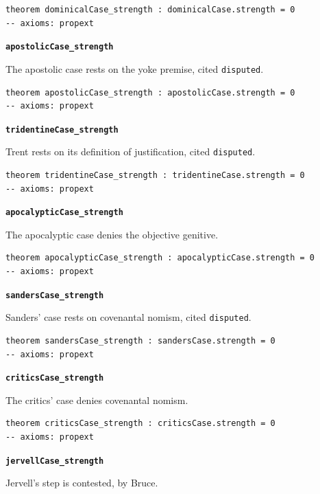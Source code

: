 \documentclass[11pt]{article}
\begin{document}
{\small\begin{verbatim}
theorem dominicalCase_strength : dominicalCase.strength = 0
-- axioms: propext
\end{verbatim}}
\par\medskip\noindent\textbf{\texttt{apostolic\allowbreak{}Case\_\allowbreak{}strength}}\par\nobreak\noindent
The apostolic case rests on the yoke premise, cited \texttt{disputed}.

{\small\begin{verbatim}
theorem apostolicCase_strength : apostolicCase.strength = 0
-- axioms: propext
\end{verbatim}}
\par\medskip\noindent\textbf{\texttt{tridentine\allowbreak{}Case\_\allowbreak{}strength}}\par\nobreak\noindent
Trent rests on its definition of justification, cited \texttt{disputed}.

{\small\begin{verbatim}
theorem tridentineCase_strength : tridentineCase.strength = 0
-- axioms: propext
\end{verbatim}}
\par\medskip\noindent\textbf{\texttt{apocalyptic\allowbreak{}Case\_\allowbreak{}strength}}\par\nobreak\noindent
The apocalyptic case denies the objective genitive.

{\small\begin{verbatim}
theorem apocalypticCase_strength : apocalypticCase.strength = 0
-- axioms: propext
\end{verbatim}}
\par\medskip\noindent\textbf{\texttt{sanders\allowbreak{}Case\_\allowbreak{}strength}}\par\nobreak\noindent
Sanders' case rests on covenantal nomism, cited \texttt{disputed}.

{\small\begin{verbatim}
theorem sandersCase_strength : sandersCase.strength = 0
-- axioms: propext
\end{verbatim}}
\par\medskip\noindent\textbf{\texttt{critics\allowbreak{}Case\_\allowbreak{}strength}}\par\nobreak\noindent
The critics' case denies covenantal nomism.

{\small\begin{verbatim}
theorem criticsCase_strength : criticsCase.strength = 0
-- axioms: propext
\end{verbatim}}
\par\medskip\noindent\textbf{\texttt{jervell\allowbreak{}Case\_\allowbreak{}strength}}\par\nobreak\noindent
Jervell's step is contested, by Bruce.
\end{document}
